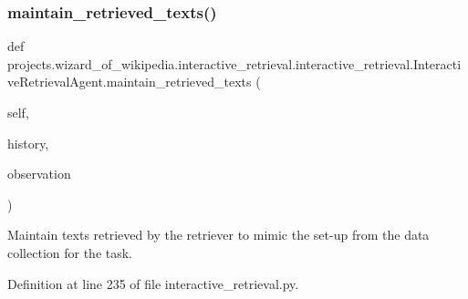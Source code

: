 \subsubsection{\texorpdfstring{maintain\+\_\+retrieved\+\_\+texts()}{maintain\_retrieved\_texts()}}
{\footnotesize\ttfamily def projects.\+wizard\+\_\+of\+\_\+wikipedia.\+interactive\+\_\+retrieval.\+interactive\+\_\+retrieval.\+Interactive\+Retrieval\+Agent.\+maintain\+\_\+retrieved\+\_\+texts (\begin{DoxyParamCaption}\item[{}]{self,  }\item[{}]{history,  }\item[{}]{observation }\end{DoxyParamCaption})}

\begin{DoxyVerb}Maintain texts retrieved by the retriever to mimic the set-up from the data
collection for the task.
\end{DoxyVerb}
 

Definition at line 235 of file interactive\+\_\+retrieval.\+py.


